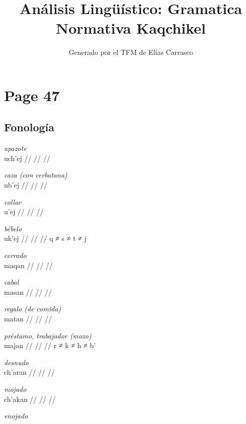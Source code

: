 \documentclass{article}%
\title{Análisis Lingüístico: Gramatica Normativa Kaqchikel}%
\author{Generado por el TFM de Elías Carrasco}%
\begin{document}
%
\normalsize%
\maketitle%
\section{Page 47}%
\label{sec:Page47}%
\subsection{Fonología}%
\label{subsec:Fonologa}%

%
\par\medskip%
\ex
\textit{apazote} \\
\begingl
\gla uch’ej //
\glb  //
\glc  //
\endgl
\xe
%
\medskip%
\par\medskip%
\ex
\textit{caza (con cerbatana)} \\
\begingl
\gla ub’ej //
\glb  //
\glc  //
\endgl
\xe
%
\medskip%
\par\medskip%
\ex
\textit{collar} \\
\begingl
\gla u’ej //
\glb  //
\glc  //
\endgl
\xe
%
\medskip%
\par\medskip%
\ex
\textit{bébelo} \\
\begingl
\gla uk’ej //
\glb  //
\glc  //
\endgl
\xe
%
\medskip%
q ≠ s ≠ t ≠ j %
\par\medskip%
\ex
\textit{cerrado} \\
\begingl
\gla maqan //
\glb  //
\glc  //
\endgl
\xe
%
\medskip%
\par\medskip%
\ex
\textit{cabal} \\
\begingl
\gla masan //
\glb  //
\glc  //
\endgl
\xe
%
\medskip%
\par\medskip%
\ex
\textit{regalo (de comida)} \\
\begingl
\gla matan //
\glb  //
\glc  //
\endgl
\xe
%
\medskip%
\par\medskip%
\ex
\textit{préstamo, trabajador (mozo)} \\
\begingl
\gla majan //
\glb  //
\glc  //
\endgl
\xe
%
\medskip%
r ≠ k ≠ h ≠ b’ %
\par\medskip%
\ex
\textit{desnudo} \\
\begingl
\gla ch’aran //
\glb  //
\glc  //
\endgl
\xe
%
\medskip%
\par\medskip%
\ex
\textit{mojado} \\
\begingl
\gla ch’akan //
\glb  //
\glc  //
\endgl
\xe
%
\medskip%
\par\medskip%
\ex
\textit{enojado} \\
\end{document}
